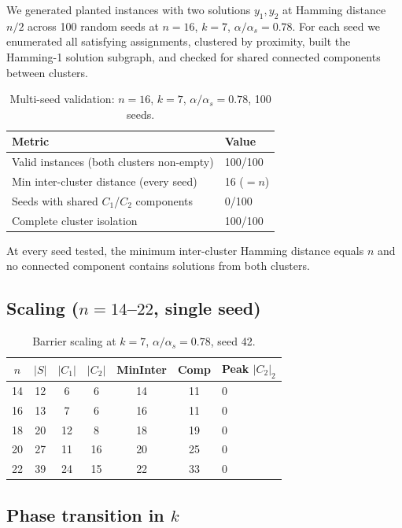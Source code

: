 \documentclass[11pt]{article}
\begin{document}
We generated planted instances with two solutions $y_1, y_2$ at Hamming distance $n/2$ across 100 random seeds at $n = 16$, $k = 7$, $\alpha/\alpha_s = 0.78$.  For each seed we enumerated all satisfying assignments, clustered by proximity, built the Hamming-1 solution subgraph, and checked for shared connected components between clusters.

\begin{table}[ht]
\centering
\caption{Multi-seed validation: $n = 16$, $k = 7$, $\alpha/\alpha_s = 0.78$, 100 seeds.}\label{tab:multiseed}
\begin{tabular}{@{}ll@{}}
\toprule
Metric & Value \\
\midrule
Valid instances (both clusters non-empty) & 100/100 \\
Min inter-cluster distance (every seed) & 16 ($= n$) \\
Seeds with shared $C_1$/$C_2$ components & 0/100 \\
Complete cluster isolation & 100/100 \\
\bottomrule
\end{tabular}
\end{table}

At every seed tested, the minimum inter-cluster Hamming distance equals $n$ and no connected component contains solutions from both clusters.


\subsection{Scaling ($n = 14$--$22$, single seed)}

\begin{table}[ht]
\centering
\caption{Barrier scaling at $k = 7$, $\alpha/\alpha_s = 0.78$, seed 42.}\label{tab:scaling}
\begin{tabular}{@{}ccccccl@{}}
\toprule
$n$ & $|S|$ & $|C_1|$ & $|C_2|$ & MinInter & Comp & Peak $|C_2|_2$ \\
\midrule
14 & 12 & 6 & 6 & 14 & 11 & 0 \\
16 & 13 & 7 & 6 & 16 & 11 & 0 \\
18 & 20 & 12 & 8 & 18 & 19 & 0 \\
20 & 27 & 11 & 16 & 20 & 25 & 0 \\
22 & 39 & 24 & 15 & 22 & 33 & 0 \\
\bottomrule
\end{tabular}
\end{table}


\subsection{Phase transition in $k$}
\end{document}
